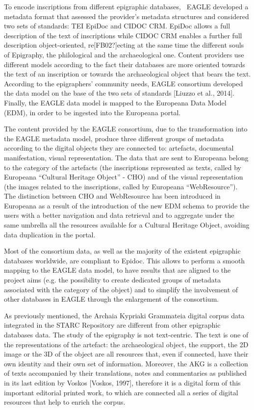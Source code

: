 \documentclass[amsthm,ebook]{saparticle}
\begin{document}
To encode inscriptions from different epigraphic databases, \ EAGLE developed a metadata format that assessed the
provider’s metadata structures and considered two sets of standards: TEI EpiDoc and CIDOC CRM. EpiDoc allows a full
description of the text of inscriptions while CIDOC CRM enables a further full description object-oriented,
re[FB02?]ecting at the same time the different souls of Epigraphy, the philological and the archaeological one. Content
providers use different models according to the fact their databases are more oriented towards the text of an
inscription or towards the archaeological object that bears the text. According to the epigraphers’ community needs,
EAGLE consortium developed the data model on the base of the two sets of standards [Liuzzo et al., 2014]. Finally, the
EAGLE data model is mapped to the Europeana Data Model (EDM), in order to be ingested into the Europeana portal.

The content provided by the EAGLE consortium, due to the transformation into the EAGLE metadata model, produce three
different groups of metadata according to the digital objects they are connected to: artefacts, documental
manifestation, visual representation. The data that are sent to Europeana belong to the category of the artefacts (the
inscriptions represented as texts, called by Europeana “Cultural Heritage Object” - CHO) and of the visual
representation (the images related to the inscriptions, called by Europeana “WebResource”). The distinction between CHO
and WebResource has been introduced in Europeana as a result of the introduction of the new EDM schema to provide the
users with a better navigation and data retrieval and to aggregate under the same umbrella all the resources available
for a Cultural Heritage Object, avoiding data duplication in the portal.

Most of the consortium data, as well as the majority of the existent epigraphic databases worldwide, are compliant to
Epidoc. This allows to perform a smooth mapping to the EAGLE data model, to have results that are aligned to the
project aims (e.g. the possibility to create dedicated groups of metadata associated with the category of the object)
and to simplify the involvement of other databases in EAGLE through the enlargement of the consortium.

As previously mentioned, the Archaia Kypriaki Grammateia digital corpus data integrated in the STARC Repository are
different from other epigraphic databases data. The study of the epigraphy is not text-centric. The text is one of the
representations of the artefact: the archaeological object, the support, the 2D image or the 3D of the object are all
resources that, even if connected, have their own identity and their own set of information. Moreover, the AKG is a
collection of texts accompanied by their translations, notes and commentaries as published in its last edition by
Voskos [Voskos, 1997], therefore it is a digital form of this important editorial printed work, to which are connected
all a series of digital resources that help to enrich the corpus.
\end{document}
